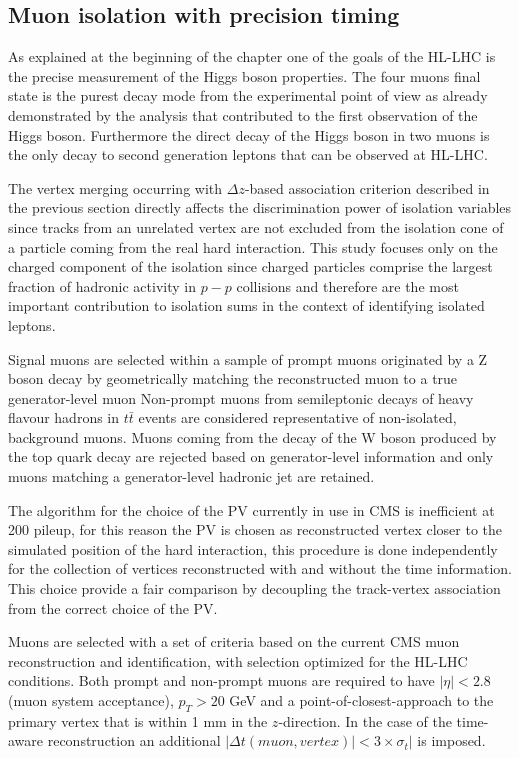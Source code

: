 \subsection{Muon isolation with precision timing}
As explained at the beginning of the chapter one of the goals of the HL-LHC is the precise measurement
of the Higgs boson properties. The four muons final state is the purest decay mode from the experimental point of
view as already demonstrated by the analysis that contributed to the first observation of the Higgs boson.
Furthermore the direct decay of the Higgs boson in two muons is the only decay to second generation
leptons that can be observed at HL-LHC.

The vertex merging occurring with $\Delta z$-based association criterion described in the previous section
directly affects the discrimination power of isolation variables since tracks from an unrelated vertex are
not excluded from the isolation cone of a particle coming from the real hard interaction.
This study focuses only on the charged component of the isolation since charged particles comprise
the largest fraction of hadronic activity in $p-p$ collisions and therefore are the most important contribution
to isolation sums in the context of identifying isolated leptons.

Signal muons are selected within a sample of prompt muons originated by a Z boson decay by geometrically matching the reconstructed
muon to a true generator-level muon
Non-prompt muons from semileptonic decays of heavy flavour hadrons in $t\bar{t}$ events are
considered representative of non-isolated, background muons. Muons coming from the decay of the W boson produced
by the top quark decay are rejected based on generator-level information and only muons matching a generator-level
hadronic jet are retained.

The algorithm for the choice of the PV currently in use in CMS is inefficient at 200 pileup, for this reason
the PV is chosen as reconstructed vertex closer to the simulated position of the hard interaction, this procedure
is done independently for the collection of vertices reconstructed with and without the time information.
This choice provide a fair comparison by decoupling the track-vertex association from the correct choice of the PV.

Muons are selected with a set of criteria based on the current CMS muon reconstruction and identification, with
selection optimized for the HL-LHC conditions. Both prompt and non-prompt muons are required to have $|\eta|<2.8$
(muon system acceptance), $p_T > 20$ GeV and a point-of-closest-approach to the primary vertex that is within 1 mm in the
$z$-direction. In the case of the time-aware reconstruction an additional $|\Delta t(muon, vertex)| < 3\times\sigma_t|$
is imposed.

